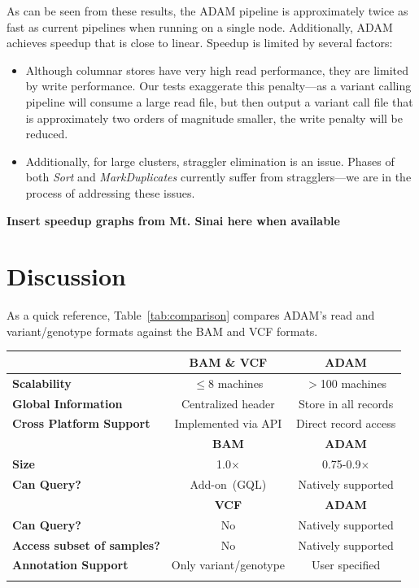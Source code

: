 \documentclass{bioinfo}
\begin{document}
As can be seen from these results, the ADAM pipeline is approximately twice as fast as current pipelines when running on a single node. Additionally, ADAM achieves
speedup that is close to linear. Speedup is limited by several factors:

\begin{itemize}
\item Although columnar stores have very high read performance, they are limited by write performance. Our tests exaggerate this penalty---as a variant calling pipeline will
consume a large read file, but then output a variant call file that is approximately two orders of magnitude smaller, the write penalty will be reduced.
\item Additionally, for large clusters, straggler elimination is an issue. Phases of both \textit{Sort} and \textit{MarkDuplicates} currently suffer from stragglers---we are in
the process of addressing these issues.
\end{itemize}

\textbf{Insert speedup graphs from Mt. Sinai here when available}

\section{Discussion}
\label{sec:discussion}

As a quick reference, Table~\ref{tab:comparison} compares ADAM's read and variant/genotype formats against the BAM and VCF formats.

\begin{table}[h]
{\begin{tabular}{ l c c }
\toprule
 & \bf BAM \& VCF & \bf ADAM \\
\midrule
\bf Scalability & $\le$8 machines & $>$100 machines \\
\bf Global Information & Centralized header & Store in all records \\
\bf Cross Platform Support & Implemented via API & Direct record access \\
\midrule
 & \bf BAM & \bf ADAM \\
\midrule
\bf Size & 1.0$\times$ & 0.75-0.9$\times$ \\
\bf Can Query? & Add-on~(GQL) & Natively supported \\ 
\midrule
& \bf VCF & \bf ADAM \\
\midrule
\bf Can Query? & No & Natively supported \\ 
\bf Access subset of samples? & No & Natively supported \\
\bf Annotation Support & Only variant/genotype & User specified \\
\botrule
\end{tabular}}{}
\end{table}
\end{document}
